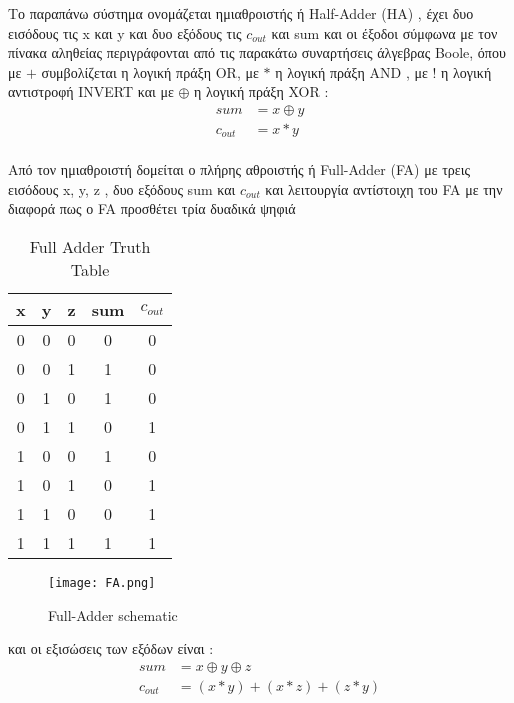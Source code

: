 Το παραπάνω σύστημα ονομάζεται ημιαθροιστής ή Half-Adder (HA) , έχει δυο εισόδους τις x και y και δυο εξόδους τις $c_{out}$ και sum και οι έξοδοι σύμφωνα με τον πίνακα αληθείας περιγράφονται από τις παρακάτω συναρτήσεις άλγεβρας Boole, όπου με $+$ συμβολίζεται η λογική πράξη ΟR, με $*$ η λογική πράξη ΑΝD , με $!$ η λογική αντιστροφή INVERT και με $\oplus$ η λογική πράξη XOR :\\
\begin{equation}
\begin{split}
    sum &= x \oplus y \\ 
    c_{out} &= x * y
\end{split}
\end{equation}\\



Από τον ημιαθροιστή δομείται ο πλήρης αθροιστής ή Full-Adder (FA) με τρεις εισόδους x, y, z , δυο εξόδους sum και $c_{out}$ και λειτουργία αντίστοιχη του FA με την διαφορά πως ο FA προσθέτει τρία δυαδικά ψηφιά \\
\begin{multicols}{2}
\hfill
\begin{table}[H]
\centering
 \begin{tabular}{||c c c | c c||} 
 \hline
 x & y & z & sum & $c_{out}$ \\ [0.5ex] 
 \hline\hline
 0 & 0 & 0 & 0 & 0 \\ 
 \hline
 0 & 0 & 1 & 1 & 0 \\
 \hline
 0 & 1 & 0 & 1 & 0 \\
 \hline
 0 & 1 & 1 & 0 & 1 \\
 \hline
 1 & 0 & 0 & 1 & 0 \\ 
 \hline
 1 & 0 & 1 & 0 & 1 \\
 \hline
 1 & 1 & 0 & 0 & 1 \\
 \hline
 1 & 1 & 1 & 1 & 1 \\
 \hline
\end{tabular}
\caption{Full Adder Truth Table}
\label{table:2}
\end{table}
\begin{figure}[H]
\centering
\texttt{[image: FA.png]}
\caption{Full-Adder schematic}
\label{FASchematic}
\end{figure}
\end{multicols}
και οι εξισώσεις των εξόδων είναι :
\begin{equation}
\begin{split}
    sum &= x \oplus y \oplus z \\
    c_{out} &= ( x * y ) + ( x * z ) + ( z * y )
\end{split}
\end{equation}




